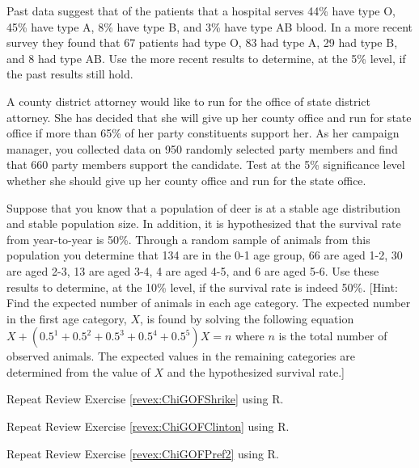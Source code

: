 \documentclass[10pt,openany]{book}\usepackage[]{graphicx}\usepackage[]{color}
\begin{document}
\begin{exsection}
  \item \label{revex:chiGOFBlood} \rhw{} Past data suggest that of the patients that a hospital serves 44\% have type O, 45\% have type A, 8\% have type B, and 3\% have type AB blood.  In a more recent survey they found that 67 patients had type O, 83 had type A, 29 had type B, and 8 had type AB.  Use the more recent results to determine, at the 5\% level, if the past results still hold. 

  \item \label{revex:ChiGOFDA} \rhw{} A county district attorney would like to run for the office of state district attorney. She has decided that she will give up her county office and run for state office if more than 65\% of her party constituents support her.  As her campaign manager, you collected data on 950 randomly selected party members and find that 660 party members support the candidate. Test at the 5\% significance level whether she should give up her county office and run for the state office. 

  \item \label{revex:ChiGOFSurv} \rhw{} Suppose that you know that a population of deer is at a stable age distribution and stable population size.  In addition, it is hypothesized that the survival rate from year-to-year is 50\%.  Through a random sample of animals from this population you determine that 134 are in the 0-1 age group, 66 are aged 1-2, 30 are aged 2-3, 13 are aged 3-4, 4 are aged 4-5, and 6 are aged 5-6.  Use these results to determine, at the 10\% level, if the survival rate is indeed 50\%.  [Hint: Find the expected number of animals in each age category.  The expected number in the first age category, $X$, is found by solving the following equation $X+(0.5^{1}+0.5^{2}+0.5^{3}+0.5^{4}+0.5^{5})X = n$ where $n$ is the total number of observed animals.  The expected values in the remaining categories are determined from the value of $X$ and the hypothesized survival rate.] 

  \item \label{revex:ChiGOFShrikeR} \rhw{} Repeat Review Exercise \ref{revex:ChiGOFShrike} using R. 

  \item \label{revex:ChiGOFClintonR} \rhw{} Repeat Review Exercise \ref{revex:ChiGOFClinton} using R. 

  \item \label{revex:ChiGOFPref2R} \rhw{} Repeat Review Exercise \ref{revex:ChiGOFPref2} using R. 


\end{exsection}
\end{document}
